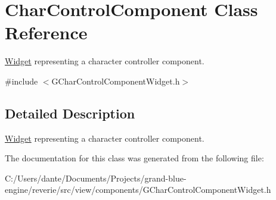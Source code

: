 \hypertarget{class_char_control_component}{}\section{Char\+Control\+Component Class Reference}
\label{class_char_control_component}


\mbox{\hyperlink{class_widget}{Widget}} representing a character controller component.  




{\ttfamily \#include $<$G\+Char\+Control\+Component\+Widget.\+h$>$}



\subsection{Detailed Description}
\mbox{\hyperlink{class_widget}{Widget}} representing a character controller component. 

The documentation for this class was generated from the following file\+:\begin{DoxyCompactItemize}
\item 
C\+:/\+Users/dante/\+Documents/\+Projects/grand-\/blue-\/engine/reverie/src/view/components/G\+Char\+Control\+Component\+Widget.\+h\end{DoxyCompactItemize}
